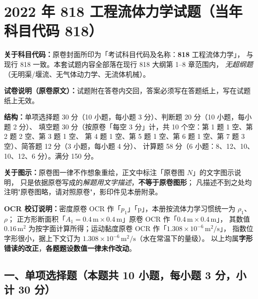 \chapter{2022 年 818 工程流体力学试题（当年科目代码 818）}

\begin{tishi}
\textbf{关于科目代码：}原卷封面所印为「考试科目代码及名称：\textbf{818} 工程流体力学」，
与现行 818 一致。本套试题内容全部落在现行 818 大纲第 1--8 章范围内，
\emph{无超纲题}（无明渠/堰流、无气体动力学、无流体机械）。

\textbf{试卷说明（原卷原文）：}试题附在答卷内交回，答案必须写在答题纸上，写在试题纸上无效。

\textbf{结构：}单项选择题 30 分（10 小题，每小题 3 分）、判断题 20 分（10 小题，每小题 2 分）、
填空题 30 分（按原卷「每空 3 分」计，共 10 个空：第 1 题 1 空、第 2 题 2 空、第 3 题 1 空、
第 4 题 1 空、第 5 题 1 空、第 6 题 1 空、第 7 题 3 空）、简答题 12 分（3 小题，每小题 4 分）、
计算题 58 分（6 小题：8、12、10、10、12、6 分）。满分 150 分。

\textbf{关于图示：}原卷图一律不作想象重绘，正文中标注「原卷图 $N$」的文字图示说明，
只是依据原卷写成的\emph{解题用文字描述}，\textbf{不等于原卷图形}；
凡描述不到之处均注明"原卷图略，请对照原卷"，影印件见本册附录。

\textbf{OCR 校订说明：}密度原卷 OCR 作「$p_1$」「p」，本册按流体力学习惯统一为 $\rho_1$、$\rho$；
正方形断面积「$A_1=0.4\,\mathrm{m}\times0.4\,\mathrm{m}$」原卷 OCR 作「$0.4\,\mathrm{m}\times0.4\,\mathrm{m}$」，
其数值 $0.16\,\mathrm{m^2}$ 为按字面计算所得；运动黏度原卷 OCR 作「$1.308\times10^{-6}\,\mathrm{m^2/s}$」，
指数位字形很小，据上下文订为 $1.308\times10^{-6}\,\mathrm{m^2/s}$（水在常温下的量级）。
以上均属\textbf{字形错读的改正}，\textbf{各题题设数值一律未作改动}。
\end{tishi}

\section{一、单项选择题（本题共 10 小题，每小题 3 分，小计 30 分）}

